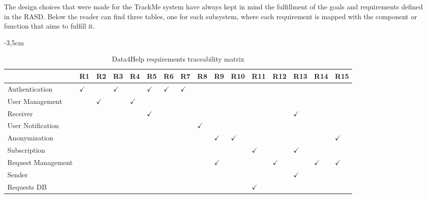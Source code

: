 The design choices that were made for the TrackMe system have always kept in mind the fulfillment of the goals and requirements defined in the RASD. Below the reader can find three tables, one for each subsystem, where each requirement is mapped with the component or function that aims to fulfill it.

\begin{table}
\begin{adjustwidth}{-3,5cm}{}
\captionsetup{justification=centering}
\caption{Data4Help requirements traceability matrix}
  \label{tab:table1}
\begin{tabular}{|l||l|l|l|l|l|l|l|l|l|l|l|l|l|l|l|}
\hline
\cellcolor[HTML]{EFEFEF}                      &\cellcolor[HTML]{EFEFEF}R1 & \cellcolor[HTML]{EFEFEF}R2 & \cellcolor[HTML]{EFEFEF}R3 & \cellcolor[HTML]{EFEFEF}R4 & \cellcolor[HTML]{EFEFEF}R5 & \cellcolor[HTML]{EFEFEF}R6 & \cellcolor[HTML]{EFEFEF}R7 & \cellcolor[HTML]{EFEFEF}R8 & \cellcolor[HTML]{EFEFEF}R9 &\cellcolor[HTML]{EFEFEF}R10 & \cellcolor[HTML]{EFEFEF}R11 & \cellcolor[HTML]{EFEFEF}R12 & \cellcolor[HTML]{EFEFEF}R13 & \cellcolor[HTML]{EFEFEF}R14 & \cellcolor[HTML]{EFEFEF}R15\\ \hline \hline
\cellcolor[HTML]{EFEFEF}Authentication  & $\checkmark$  &  & $\checkmark$  &    & $\checkmark$  & $\checkmark$  & $\checkmark$  &    &    &     &     &     &     &     & \\ \hline
\cellcolor[HTML]{EFEFEF} User Management      &    & $\checkmark$   &    & $\checkmark$  &    &    &    &    &    &     &     &     &     &     & \\ \hline
\cellcolor[HTML]{EFEFEF} Receiver         &    &    &    &    & $\checkmark$  &    &    &    &    &     &     &     & $\checkmark$   &     & \\ \hline
\cellcolor[HTML]{EFEFEF} User Notification     &    &    &    &    &    &    &    & $\checkmark$  &    &     &     &     &     &     & \\ \hline
\cellcolor[HTML]{EFEFEF} Anonymization   &    &    &    &    &    &    &    &    & $\checkmark$  & $\checkmark$   &     &     &     &     & $\checkmark$ \\ \hline
\cellcolor[HTML]{EFEFEF} Subscription   &    &    &    &    &    &    &    &    &    &     & $\checkmark$   &     & $\checkmark$   &     & \\ \hline
\cellcolor[HTML]{EFEFEF} Request Management       &    &    &    &    &    &    &    &    & $\checkmark$  &     &     & $\checkmark$   &     & $\checkmark$   & $\checkmark$ \\ \hline
\cellcolor[HTML]{EFEFEF} Sender           &    &    &    &    &    &    &    &    &    &     &     &     & $\checkmark$   &     & \\ \hline
\cellcolor[HTML]{EFEFEF} Requests DB           &    &    &    &    &    &    &    &    &    &     &  $\checkmark$   &     &   &     & \\ \hline
\end{tabular}
\end{adjustwidth}
\end{table}


